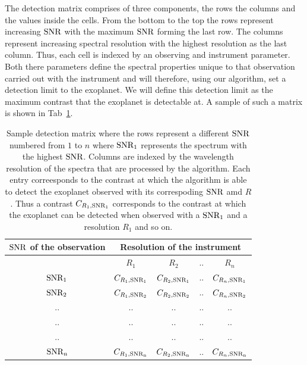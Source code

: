 The detection matrix comprises of three components, the rows the columns and the values inside the cells.
From the bottom to the top the rows represent increasing $\rm{SNR}$ with the maximum $\rm{SNR}$ forming the last row.
The columns represent increasing spectral resolution with the highest resolution as the last column.
Thus, each cell is indexed by an observing and instrument parameter.
Both there parameters define the spectral properties unique to that observation carried out with the instrument and will therefore, using our algorithm, set a detection limit to the exoplanet.
We will define this detection limit as the maximum contrast that the exoplanet is detectable at. 
A sample of such a matrix is shown in Tab~\ref{tab:sample_detmat}.
\begin{table}[!ht]
    \centering
    \begin{tabular}{||c|c|c|c|c||}
    \hline
    \hline
         {$\rm{SNR}$ of the observation}& \multicolumn{4}{c}{Resolution of the instrument}\\
         \hline
                  &  $R_1$              &$R_2$        &..&$R_n$\\
         \hline
         $\rm{SNR_1}$&$C_{R_1,\rm{SNR_1}}$&$C_{R_2,\rm{SNR_1}}$&..&$C_{R_n,\rm{SNR}_1}$\\
         \hline
         $\rm{SNR_{2}}$&$C_{R_1,\rm{SNR_2}}$&$C_{R_2,\rm{SNR_2}}$&$..$& $C_{R_n,\rm{SNR_2}}$\\
         
                ..  & .. &.. &  .. &..    \\ 
                ..    & ..  &.. &  .. &..    \\ 
                ..    & .. &.. &  .. &..    \\ 
                    \hline
        $\rm{SNR}_n$&$C_{R_1,\rm{SNR}_n}$&$C_{R_2,\rm{SNR}_n}$&..&$C_{R_n,\rm{SNR}_n}$\\
         \hline
         \hline
    \end{tabular}
    \caption{Sample detection matrix where the rows represent a different $\rm{SNR}$ numbered from $1$ to $n$ where $\rm{SNR_1}$ represents the spectrum with the highest $\rm{SNR}$.
    Columns are indexed by the wavelength resolution of the spectra that are processed by the algorithm.
    Each entry correesponds to the contrast at which the algorithm is able to detect the exoplanet observed with its correspoding $\rm{SNR}$ amd $R$.
    Thus a contrast $C_{R_1,\rm{SNR}_1}$ corresponds to the contrast at which the exoplanet can be detected when observed with a $\rm{SNR_1}$ and a resolution $R_1$ and so on.}
    \label{tab:sample_detmat}
\end{table}
